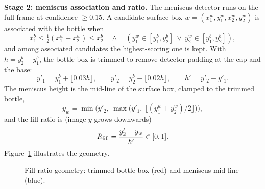 \noindent\textbf{Stage 2: meniscus association and ratio.} The meniscus detector runs on the full frame at confidence $\geq0.15$. A candidate surface box $w=(x^w_1,y^w_1,x^w_2,y^w_2)$ is associated with the bottle when
\begin{equation}
    x^b_1 \leq \tfrac{1}{2}(x^w_1+x^w_2) \leq x^b_2
    \quad\wedge\quad
    \left(y^w_1\in[y^b_1,y^b_2] \ \vee\ y^w_2\in[y^b_1,y^b_2]\right),
    \label{eq:assoc}
\end{equation}
and among associated candidates the highest-scoring one is kept. With $h=y^b_2-y^b_1$, the bottle box is trimmed to remove detector padding at the cap and the base:
\begin{equation}
    y'_1 = y^b_1+\lfloor 0.03h\rfloor,\qquad y'_2 = y^b_2-\lfloor 0.02h\rfloor,\qquad h'=y'_2-y'_1 .
    \label{eq:trim}
\end{equation}
The meniscus height is the mid-line of the surface box, clamped to the trimmed bottle,
\begin{equation}
    y_w = \min\!\Big(y'_2,\ \max\!\big(y'_1,\ \lfloor (y^w_1+y^w_2)/2\rfloor\big)\Big),
\end{equation}
and the fill ratio is (image $y$ grows downwards)
\begin{equation}
    R_{\mathrm{fill}} = \frac{y'_2-y_w}{h'}\in[0,1].
    \label{eq:rfill}
\end{equation}
Figure~\ref{fig:fill-geom} illustrates the geometry.

\begin{figure}[htbp]
\centering
{}
\caption{Fill-ratio geometry: trimmed bottle box (red) and meniscus mid-line (blue).}
\label{fig:fill-geom}
\end{figure}

